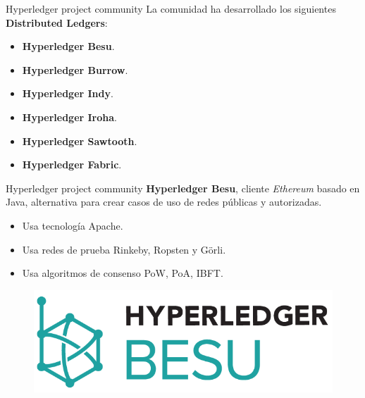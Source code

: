 \documentclass{beamer}
\begin{document}
	\begin{frame}
		\begin{block}{Hyperledger project community}
			La comunidad ha desarrollado los siguientes \textbf{Distributed Ledgers}:

			\begin{itemize}
				\item \textbf{Hyperledger Besu}.
				\item \textbf{Hyperledger Burrow}.
				\item \textbf{Hyperledger Indy}.
				\item \textbf{Hyperledger Iroha}.
				\item \textbf{Hyperledger Sawtooth}.
				\item \textbf{Hyperledger Fabric}.
			\end{itemize}
		\end{block}
	\end{frame}

	\begin{frame}
		\begin{block}{Hyperledger project community}
			\textbf{Hyperledger Besu}, cliente \textit{Ethereum} basado en Java, alternativa para crear casos de uso de redes públicas y autorizadas.
			\begin{itemize}
				\item Usa tecnología Apache.
				\item Usa redes de prueba Rinkeby, Ropsten y Görli.
				\item Usa algoritmos de consenso PoW, PoA, IBFT.
			\end{itemize}
			\begin{figure}[h]
				\includegraphics[scale=.3]{besu_logo}
				\centering
			\end{figure}
		\end{block}
	\end{frame}
\end{document}
